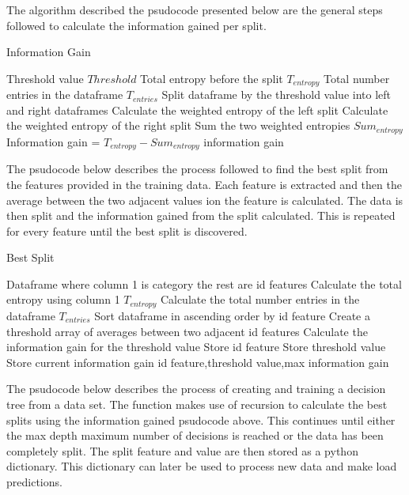 The algorithm described the psudocode  presented below are the general steps followed to calculate the information gained per split. 
\begin{algorithm}[H]
\caption{Information Gain}
\begin{algorithmic}
\Require Threshold value $Threshold$
\Require Total entropy before the split $T_{entropy}$
\Require Total number entries in the dataframe $T_{entries}$
\State Split dataframe by the threshold value into left and right dataframes
\State Calculate the weighted entropy of the left split
\State Calculate the weighted entropy of the right split
\State Sum the two weighted entropies $Sum_{entropy}$
\State Information gain  = $T_{entropy} - Sum_{entropy}$
\State \Return information gain
\end{algorithmic}
\end{algorithm}

The psudocode below describes the process followed to find the best split from the features provided in the training data. Each feature is extracted and then the average between the two adjacent values ion the feature is calculated. The data is then split and the information gained from the split calculated. This is repeated for every feature until the best split is discovered.  

\begin{algorithm}[H]
\caption{Best Split}
\begin{algorithmic}
\Require Dataframe where column 1 is category the rest are id features
\State Calculate the total entropy using column 1 $T_{entropy}$
\State Calculate the total number entries in the dataframe $T_{entries}$
\State Sort dataframe in ascending order by id feature
\State Create a threshold array of averages between two adjacent id features
\State Calculate the information gain for the threshold value
\EndFor
{}
\State Store id feature
\State Store threshold value
\State Store current information gain
\EndIf
\EndFor
\State \Return id feature,threshold value,max information gain
\end{algorithmic}
\end{algorithm}

The psudocode below describes the process of creating and training a decision tree from a data set. The function makes use of recursion to calculate the best splits using the information gained psudocode above. This continues until either the max depth maximum number of decisions is reached or the data has been completely split. The split feature and value are then stored as a python dictionary. This dictionary can later be used to process new data and make load predictions.   

